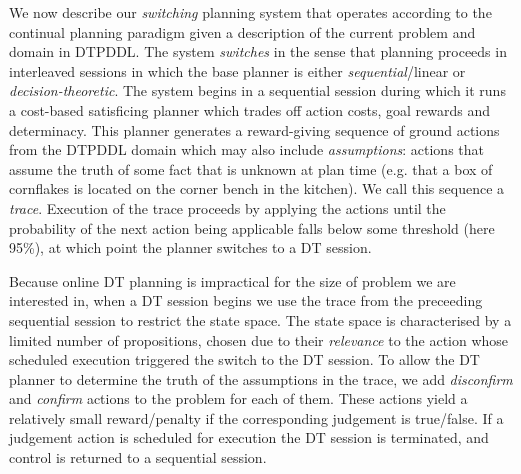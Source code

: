 
We now describe our {\em switching} planning system that operates
according to the continual planning paradigm given a description of
the current problem and domain in DTPDDL. The system {\em
switches} in the sense that planning proceeds in interleaved
sessions in which the base planner is either {\em sequential}/linear
or {\em decision-theoretic}.
The system begins in a sequential session during which it runs a
cost-based satisficing planner which trades off action costs, goal
rewards and determinacy. This planner generates a reward-giving
sequence of ground actions from the DTPDDL domain which may also
include {\em assumptions}: actions that assume the truth of some fact
that is unknown at plan time (e.g. that a box of cornflakes is located
on the corner bench in the kitchen). We call this sequence a {\em
trace}. Execution of the trace proceeds by applying the actions until
the probability of the next action being applicable falls below some
threshold (here 95\%), at which point the planner switches to a DT session. 

Because online DT planning is impractical for the size of problem we
are interested in, when a DT session begins we use the trace from the
preceeding sequential session to restrict the state space. The state space is characterised by a limited number of propositions,
chosen due to their {\em relevance} to the action whose scheduled
execution triggered the switch to the DT session.
To allow the DT planner to
determine the truth of the assumptions in the trace, we add {\em
disconfirm} and {\em confirm} actions to the problem for each of
them. These actions yield a relatively small reward/penalty if the
corresponding judgement is true/false. If a judgement action is
scheduled for execution the DT session is terminated, and control is
returned to a sequential session.

